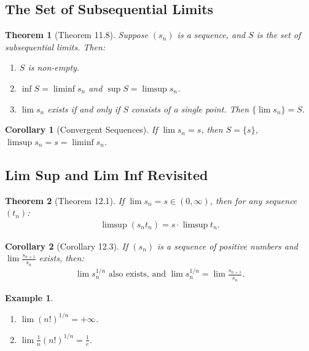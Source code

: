 \documentclass[9pt]{article}
\theoremstyle{definition}
\theoremstyle{plain}
\newtheorem{theorem}{Theorem}
\newtheorem{example}{Example}
\newtheorem{corollary}{Corollary}
\begin{document}
\subsection*{The Set of Subsequential Limits}
\begin{theorem}[Theorem 11.8]
Suppose $ (s_n) $ is a sequence, and $ S $ is the set of subsequential limits. Then:
\begin{enumerate}
    \item $ S $ is non-empty.
    \item $ \inf S = \liminf s_n $ and $ \sup S = \limsup s_n $.
    \item $ \lim s_n $ exists if and only if $ S $ consists of a single point. Then $ \{\lim s_n\} = S $.
\end{enumerate}
\end{theorem}

\begin{corollary}[Convergent Sequences]
If $ \lim s_n = s $, then $ S = \{s\} $, $ \limsup s_n = s = \liminf s_n $.
\end{corollary}

\subsection*{Lim Sup and Lim Inf Revisited}
\begin{theorem}[Theorem 12.1]
If $ \lim s_n = s \in (0, \infty) $, then for any sequence $ (t_n) $:
\begin{align}
\limsup (s_n t_n) = s \cdot \limsup t_n.
\end{align}
\end{theorem}

\begin{corollary}[Corollary 12.3]
If $ (s_n) $ is a sequence of positive numbers and $ \lim \frac{s_{n+1}}{s_n} $ exists, then:
\begin{align}
\lim s_n^{1/n} \text{ also exists, and } \lim s_n^{1/n} = \lim \frac{s_{n+1}}{s_n}.
\end{align}
\end{corollary}

\begin{example}

\begin{enumerate}
    \item $ \lim (n!)^{1/n} = +\infty $.
    \item $ \lim \frac{1}{n} (n!)^{1/n} = \frac{1}{e} $.
\end{enumerate}
\end{example}
\end{document}
